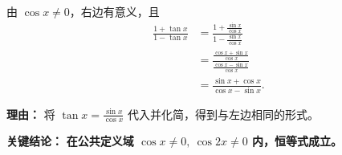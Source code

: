 \begin{examplebox}
\begin{description}[style=nextline, leftmargin=2.8em, labelsep=0.5em, itemsep=0.45em]
		\item[\textbf{第四步（弦化切）：}]
		      由 $\cos x\ne0$，右边有意义，且
		      \[
			      \begin{aligned}
				      \frac{1+\tan x}{1-\tan x}
				       & = \frac{1+\frac{\sin x}{\cos x}}{1-\frac{\sin x}{\cos x}}           \\
				       & = \frac{\frac{\cos x+\sin x}{\cos x}}{\frac{\cos x-\sin x}{\cos x}} \\
				       & = \frac{\sin x+\cos x}{\cos x-\sin x}.
			      \end{aligned}
		      \]
		      \par\textbf{理由：} 将 $\tan x = \frac{\sin x}{\cos x}$ 代入并化简，得到与左边相同的形式。
	\end{description}

	\textbf{\textcolor{CExample}{关键结论：}} \textbf{在公共定义域 $\cos x\ne0,\ \cos2x\ne0$ 内，恒等式成立。}

\end{examplebox}